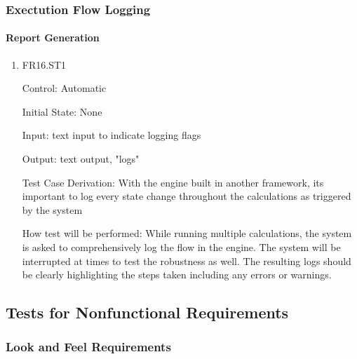 \documentclass[12pt, titlepage]{article}
\begin{document}
\subsubsection{Exectution Flow Logging}

\paragraph{Report Generation}

\begin{enumerate}

\item{FR16.ST1\\}

Control: Automatic
					
Initial State: None
					
Input: text input to indicate logging flags 
					
Output: text output, "logs"

Test Case Derivation: With the engine built in another framework, its important to log every state change throughout the calculations as triggered by the system

How test will be performed: While running multiple calculations, the system is asked to comprehensively log the flow in the engine. The system will be interrupted at times to test the robustness as well. The resulting logs should be clearly highlighting the steps taken including any errors or warnings.
					
\end{enumerate}

\subsection{Tests for Nonfunctional Requirements}



\subsubsection{Look and Feel Requirements}
\end{document}
